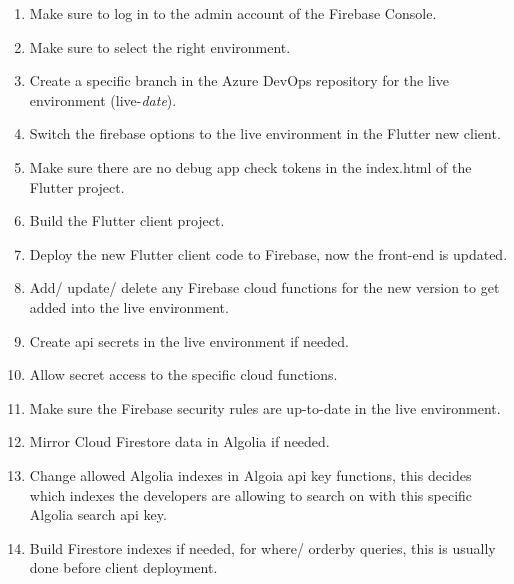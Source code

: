 \begin{multicols}{2}
      \begin{enumerate}
            \item Make sure to log in to the admin account of the Firebase Console.
            \item Make sure to select the right environment.
            \item Create a specific branch in the Azure DevOps repository for the live environment (live-\textit{date}).
            \item Switch the firebase options to the live environment in the Flutter new client.
            \item Make sure there are no debug app check tokens in the index.html of the Flutter project.
            \item Build the Flutter client project.
            \item Deploy the new Flutter client code to Firebase, now the front-end is updated.
            \item Add/ update/ delete any Firebase cloud functions for the new version to get added into the live environment.
            \item Create \acrshort{api} secrets in the live environment if needed.
            \item Allow secret access to the specific cloud functions.
            \item Make sure the Firebase security rules are up-to-date in the live environment.
            \item Mirror Cloud Firestore data in Algolia if needed.
            \item Change allowed Algolia indexes in Algoia \acrshort{api} key functions, this decides which indexes the developers
                  are allowing to search on with this specific Algolia search \acrshort{api} key.
            \item Build Firestore indexes if needed, for where/ orderby queries, this is usually done before client deployment.
      \end{enumerate}

\end{multicols}
